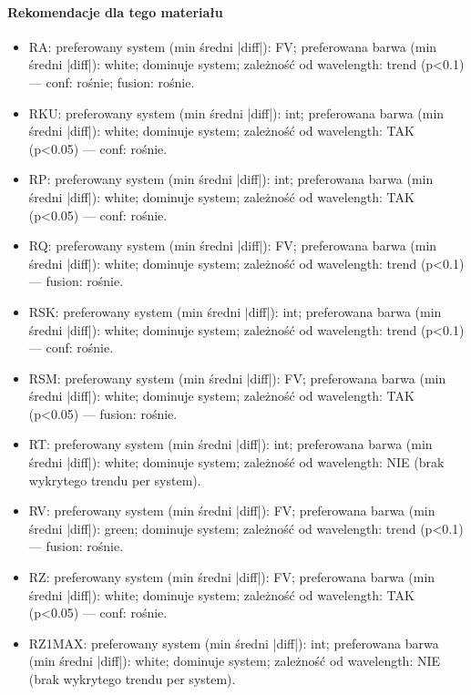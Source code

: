 \documentclass[
  10pt,
]{article}
\begin{document}
\paragraph{Rekomendacje dla tego materiału}
\begin{itemize}
\item RA: preferowany system (min średni |diff|): FV; preferowana barwa (min średni |diff|): white; dominuje system; zależność od wavelength: trend (p<0.1) — conf: rośnie; fusion: rośnie.
\item RKU: preferowany system (min średni |diff|): int; preferowana barwa (min średni |diff|): white; dominuje system; zależność od wavelength: TAK (p<0.05) — conf: rośnie.
\item RP: preferowany system (min średni |diff|): int; preferowana barwa (min średni |diff|): white; dominuje system; zależność od wavelength: TAK (p<0.05) — conf: rośnie.
\item RQ: preferowany system (min średni |diff|): FV; preferowana barwa (min średni |diff|): white; dominuje system; zależność od wavelength: trend (p<0.1) — fusion: rośnie.
\item RSK: preferowany system (min średni |diff|): int; preferowana barwa (min średni |diff|): white; dominuje system; zależność od wavelength: trend (p<0.1) — conf: rośnie.
\item RSM: preferowany system (min średni |diff|): FV; preferowana barwa (min średni |diff|): white; dominuje system; zależność od wavelength: TAK (p<0.05) — fusion: rośnie.
\item RT: preferowany system (min średni |diff|): int; preferowana barwa (min średni |diff|): white; dominuje system; zależność od wavelength: NIE (brak wykrytego trendu per system).
\item RV: preferowany system (min średni |diff|): FV; preferowana barwa (min średni |diff|): green; dominuje system; zależność od wavelength: trend (p<0.1) — fusion: rośnie.
\item RZ: preferowany system (min średni |diff|): FV; preferowana barwa (min średni |diff|): white; dominuje system; zależność od wavelength: TAK (p<0.05) — conf: rośnie.
\item RZ1MAX: preferowany system (min średni |diff|): int; preferowana barwa (min średni |diff|): white; dominuje system; zależność od wavelength: NIE (brak wykrytego trendu per system).
\end{itemize}
\end{document}
